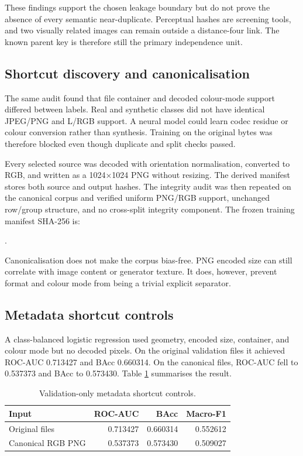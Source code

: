 \documentclass[12pt,a4paper]{article}
\begin{document}
These findings support the chosen leakage boundary but do not prove the absence of every semantic
near-duplicate. Perceptual hashes are screening tools, and two visually related images can remain
outside a distance-four link. The known parent key is therefore still the primary independence
unit.

\subsection{Shortcut discovery and canonicalisation}

The same audit found that file container and decoded colour-mode support differed between labels.
Real and synthetic classes did not have identical JPEG/PNG and L/RGB support. A neural model could
learn codec residue or colour conversion rather than synthesis. Training on the original bytes was
therefore blocked even though duplicate and split checks passed.

Every selected source was decoded with orientation normalisation, converted to RGB, and written as
a 1024×1024 PNG without resizing. The derived manifest stores both source and output hashes. The
integrity audit was then repeated on the canonical corpus and verified uniform PNG/RGB support,
unchanged row/group structure, and no cross-split integrity component. The frozen training
manifest SHA-256 is:

\begin{center}
\small{}.
\end{center}

Canonicalisation does not make the corpus bias-free. PNG encoded size can still correlate with
image content or generator texture. It does, however, prevent format and colour mode from being a
trivial explicit separator.

\subsection{Metadata shortcut controls}

A class-balanced logistic regression used geometry, encoded size, container, and colour mode but
no decoded pixels. On the original validation files it achieved ROC-AUC 0.713427 and BAcc
0.660314. On the canonical files, ROC-AUC fell to 0.537373 and BAcc to 0.573430. Table
\ref{tab:metadata-control} summarises the result.

\begin{table}[ht]
\centering
\caption{Validation-only metadata shortcut controls.}
\label{tab:metadata-control}
\begin{tabular}{lrrr}
\toprule
Input & ROC-AUC & BAcc & Macro-F1\\
\midrule
Original files & 0.713427 & 0.660314 & 0.552612\\
Canonical RGB PNG & 0.537373 & 0.573430 & 0.509027\\
\bottomrule
\end{tabular}
\end{table}
\end{document}
